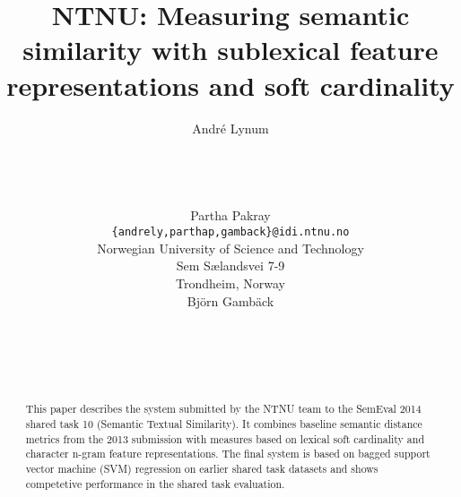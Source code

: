 \documentclass[11pt]{article}
\title{NTNU: Measuring semantic similarity with sublexical feature representations and soft cardinality}
\author{Andr\'{e} Lynum \\
  \\
  \\
  \\
  \\
  \And
  Partha Pakray \\
  {\tt \{andrely,parthap,gamback\}@idi.ntnu.no} \\
  Norwegian University of Science and Technology \\
  Sem S{\ae}landsvei 7-9 \\
  Trondheim, Norway \\
  \And
  Bj\"{o}rn Gamb\"{a}ck \\
  \\
  \\
  \\
  \\
}
\date{}
\begin{document}
\maketitle
\begin{abstract}
  This paper describes the system submitted by the NTNU team to the SemEval 2014 shared task 10 (Semantic Textual Similarity). It combines baseline semantic distance metrics from the 2013 submission with measures based on lexical soft cardinality and character n-gram feature representations. The final system is based on bagged support vector machine (SVM) regression on earlier shared task datasets and shows competetive performance in the shared task evaluation.
\end{abstract}
















\end{document}
